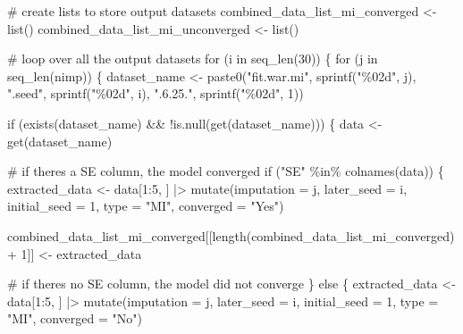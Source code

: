 \documentclass[
]{article}
\newenvironment{Shaded}{}{}
\newcommand{\AttributeTok}[1]{\textcolor[rgb]{0.84,0.23,0.29}{#1}}
\newcommand{\CommentTok}[1]{\textcolor[rgb]{0.42,0.45,0.49}{#1}}
\newcommand{\ControlFlowTok}[1]{\textcolor[rgb]{0.84,0.23,0.29}{#1}}
\newcommand{\DecValTok}[1]{\textcolor[rgb]{0.00,0.36,0.77}{#1}}
\newcommand{\FunctionTok}[1]{\textcolor[rgb]{0.44,0.26,0.76}{#1}}
\newcommand{\NormalTok}[1]{\textcolor[rgb]{0.14,0.16,0.18}{#1}}
\newcommand{\OtherTok}[1]{\textcolor[rgb]{0.44,0.26,0.76}{#1}}
\newcommand{\SpecialCharTok}[1]{\textcolor[rgb]{0.00,0.36,0.77}{#1}}
\newcommand{\StringTok}[1]{\textcolor[rgb]{0.01,0.18,0.38}{#1}}
\begin{document}
\begin{Shaded}
\begin{Highlighting}[]
\CommentTok{\# create lists to store output datasets}
\NormalTok{combined\_data\_list\_mi\_converged }\OtherTok{\textless{}{-}} \FunctionTok{list}\NormalTok{()}
\NormalTok{combined\_data\_list\_mi\_unconverged  }\OtherTok{\textless{}{-}} \FunctionTok{list}\NormalTok{()}

\CommentTok{\# loop over all the output datasets}
\ControlFlowTok{for}\NormalTok{ (i }\ControlFlowTok{in} \FunctionTok{seq\_len}\NormalTok{(}\DecValTok{30}\NormalTok{)) \{}
\ControlFlowTok{for}\NormalTok{ (j }\ControlFlowTok{in} \FunctionTok{seq\_len}\NormalTok{(nimp)) \{}
\NormalTok{  dataset\_name }\OtherTok{\textless{}{-}} \FunctionTok{paste0}\NormalTok{(}\StringTok{"fit.war.mi"}\NormalTok{, }\FunctionTok{sprintf}\NormalTok{(}\StringTok{"\%02d"}\NormalTok{, j), }
                         \StringTok{".seed"}\NormalTok{, }\FunctionTok{sprintf}\NormalTok{(}\StringTok{"\%02d"}\NormalTok{, i), }\StringTok{".6.25."}\NormalTok{, }
                         \FunctionTok{sprintf}\NormalTok{(}\StringTok{"\%02d"}\NormalTok{, }\DecValTok{1}\NormalTok{))}
  
  \ControlFlowTok{if}\NormalTok{ (}\FunctionTok{exists}\NormalTok{(dataset\_name) }\SpecialCharTok{\&\&} \SpecialCharTok{!}\FunctionTok{is.null}\NormalTok{(}\FunctionTok{get}\NormalTok{(dataset\_name))) \{}
\NormalTok{    data }\OtherTok{\textless{}{-}} \FunctionTok{get}\NormalTok{(dataset\_name)}
    
    \CommentTok{\# if there\textquotesingle{}s a SE column, the model converged}
    \ControlFlowTok{if}\NormalTok{ (}\StringTok{"SE"} \SpecialCharTok{\%in\%} \FunctionTok{colnames}\NormalTok{(data)) \{}
\NormalTok{      extracted\_data }\OtherTok{\textless{}{-}}\NormalTok{ data[}\DecValTok{1}\SpecialCharTok{:}\DecValTok{5}\NormalTok{, ] }\SpecialCharTok{|\textgreater{}}
        \FunctionTok{mutate}\NormalTok{(}\AttributeTok{imputation =}\NormalTok{ j,}
               \AttributeTok{later\_seed =}\NormalTok{ i,}
               \AttributeTok{initial\_seed =} \DecValTok{1}\NormalTok{,}
               \AttributeTok{type =} \StringTok{"MI"}\NormalTok{,}
               \AttributeTok{converged =} \StringTok{"Yes"}\NormalTok{)}
      
\NormalTok{      combined\_data\_list\_mi\_converged[[}\FunctionTok{length}\NormalTok{(combined\_data\_list\_mi\_converged) }\SpecialCharTok{+} \DecValTok{1}\NormalTok{]] }\OtherTok{\textless{}{-}}\NormalTok{ extracted\_data}
      
    \CommentTok{\# if there\textquotesingle{}s no SE column, the model did not converge}
\NormalTok{    \} }\ControlFlowTok{else}\NormalTok{ \{}
\NormalTok{      extracted\_data }\OtherTok{\textless{}{-}}\NormalTok{ data[}\DecValTok{1}\SpecialCharTok{:}\DecValTok{5}\NormalTok{, ] }\SpecialCharTok{|\textgreater{}}
        \FunctionTok{mutate}\NormalTok{(}\AttributeTok{imputation =}\NormalTok{ j,}
               \AttributeTok{later\_seed =}\NormalTok{ i,}
               \AttributeTok{initial\_seed =} \DecValTok{1}\NormalTok{,}
               \AttributeTok{type =} \StringTok{"MI"}\NormalTok{,}
               \AttributeTok{converged =} \StringTok{"No"}\NormalTok{)}
      

\end{Highlighting}
\end{Shaded}
\end{document}
